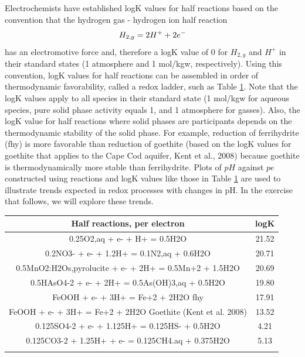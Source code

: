 Electrochemists have established logK values for 
half reactions based on the 
convention that the hydrogen gas -
hydrogen ion half reaction
\begin{equation}
H_{2,g}  =  2H^+ + 2e^- \\   
\label{eq:rdx9}
\end{equation} 
has an electromotive force and, therefore a logK 
value of 0 for $H_{2,g}$ and $H^+$ in their 
standard states (1 atmosphere and 1 mol/kgw, respectively).  
Using this convention, logK values for half reactions can be assembled 
in order of thermodynamic favorability, 
called a redox ladder, such as Table \ref{tab:rdx1}.  
Note that the logK values apply to all species in their standard state 
(1 mol/kgw for aqueous species, pure solid phase activity 
equals 1, and 1 atmosphere for gasses).  
Also, the logK value for half reactions where solid phases are participants 
depends on the thermodynamic stability of the solid phase.  
For example, reduction of ferrihydrite (fhy) is more favorable than 
reduction of goethite (based on the logK values for goethite that 
applies to the Cape Cod aquifer, Kent et al., 2008) because goethite 
is thermodynamically more stable than ferrihydrite.  
Plots of $pH$ against $pe$ constructed using reactions and logK values like 
those in Table \ref{tab:rdx1} are used to illustrate 
trends expected in redox processes 
with changes in pH. In the exercise that follows, we will explore these trends.

\begin{table}[h]
\centering
\footnotesize
\begin{tabular}{cc}
\toprule
Half reactions, per electron																& logK \\ \hline
0.25O2,aq + e- + H+ = 0.5H2O																& 21.52 \\
0.2NO3- + e- + 1.2H+ = 0.1N2,aq + 0.6H2O										& 20.71 \\
0.5MnO2:H2Os,pyrolucite + e- + 2H+ = 0.5Mn+2 + 1.5H2O				& 20.69 \\
0.5HAsO4-2 + e- + 2H+   =  0.5As(OH)3,aq +  0.5H2O					& 19.80 \\
FeOOH + e- + 3H+ = Fe+2 + 2H2O  fhy													& 17.91 \\
FeOOH + e- + 3H+ = Fe+2 + 2H2O  Goethite (Kent et al. 2008)	& 13.52 \\
0.125SO4-2 + e- + 1.125H+ = 0.125HS- + 0.5H2O								& 4.21 \\
0.125CO3-2 + 1.25H+ + e- = 0.125CH4.aq + 0.375H2O						& 5.13 \\
\bottomrule
\label{tab:rdx1}
\end{tabular}
\end{table}	

